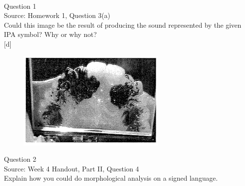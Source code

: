 \documentclass[12pt]{article}
\begin{document}
\newpage

\begin{center}
\textbf{{\color{red}{\HUGE END OF EXAM}}}\\

\end{center}
\newpage

\begin{center}
\textbf{{\color{blue}{\HUGE START OF EXAM\\}}}

\textbf{{\color{blue}{\HUGE Student ID: 43672\\}}}

\textbf{{\color{blue}{\HUGE 4:50\\}}}

\end{center}
\newpage

{\large Question 1}\\

Source: Homework 1, Question 3(a)\\

Could this image be the result of producing the sound represented by the given IPA symbol? Why or why not?\\

{[d]}

\begin{figure}[H]
\includegraphics{../images/staticpalatography_fricative.png}
\end{figure}

\newpage

{\large Question 2}\\

Source: Week 4 Handout, Part II, Question 4\\

Explain how you could do morphological analysis on a signed language.\\


\newpage

\begin{center}
\textbf{{\color{red}{\HUGE END OF EXAM}}}\\

\end{center}
\newpage
\end{document}
